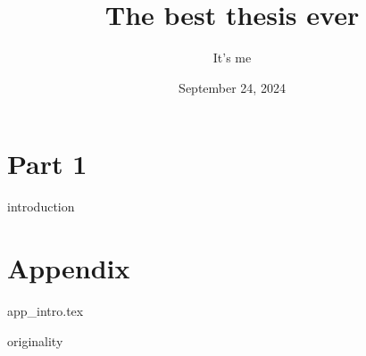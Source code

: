 \documentclass[
    10pt,
	colorful,
	boxey,
 a4paper,
]{tufte-style-thesis}
\author{It's me}
\title{The best thesis ever}
\date{September 24, 2024}
\begin{document}
\ifdebug
    \layout
\fi


\frontmatter
% 
\cleardoublepage
{}
\pagestyle{empty}
\begin{wide}

\end{wide}






\tableofcontents
\listoffigures
\listoftables

\clearpage
\pagestyle{fancy}


\mainmatter
{}

\part{Part 1}
{introduction}


\thispagestyle{empty}
\printbibliography
\cleardoublepage

\part*{Appendix}
\appendix

\setcounter{table}{0}
\setcounter{figure}{0}
\setcounter{section}{0}
\setcounter{chapter}{0}

\renewcommand{\thetable}{\thesection.\arabic{table}}
\renewcommand{\thefigure}{\thesection.\arabic{figure}}

{app_intro.tex}

\cleardoublepage


\thispagestyle{empty}
{originality}
\cleardoublepage
% 
\end{document}
